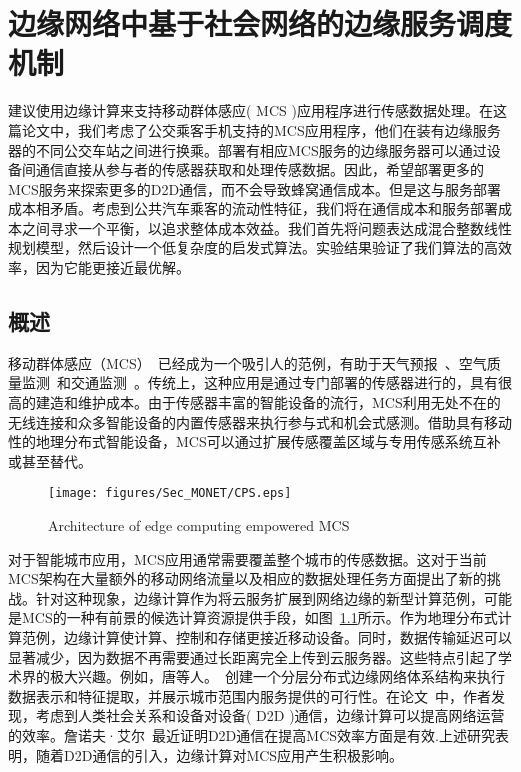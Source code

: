 \chapter{边缘网络中基于社会网络的边缘服务调度机制}

建议使用边缘计算来支持移动群体感应( MCS )应用程序进行传感数据处理。在这篇论文中，我们考虑了公交乘客手机支持的MCS应用程序，他们在装有边缘服务器的不同公交车站之间进行换乘。部署有相应MCS服务的边缘服务器可以通过设备间通信直接从参与者的传感器获取和处理传感数据。因此，希望部署更多的MCS服务来探索更多的D2D通信，而不会导致蜂窝通信成本。但是这与服务部署成本相矛盾。考虑到公共汽车乘客的流动性特征，我们将在通信成本和服务部署成本之间寻求一个平衡，以追求整体成本效益。我们首先将问题表达成混合整数线性规划模型，然后设计一个低复杂度的启发式算法。实验结果验证了我们算法的高效率，因为它能更接近最优解。


\section{概述}

移动群体感应（MCS）~\cite{ganti2011mobile,DBLP:journals/csur/GuoWYWYHZ15}已经成为一个吸引人的范例，有助于天气预报~\cite{DBLP:conf/icc/YuZZWKL10}、空气质量监测~\cite{DBLP:conf/huc/ZhangXWC14}和交通监测~\cite{DBLP:conf/icdcs/ZhouJL15}。传统上，这种应用是通过专门部署的传感器进行的，具有很高的建造和维护成本。由于传感器丰富的智能设备的流行，MCS利用无处不在的无线连接和众多智能设备的内置传感器来执行参与式和机会式感测。借助具有移动性的地理分布式智能设备，MCS可以通过扩展传感覆盖区域与专用传感系统互补或甚至替代。

\begin{figure}[!h]
\centering
\texttt{[image: figures/Sec\_MONET/CPS.eps]}
\vspace{-0.5em}
\caption{Architecture of edge computing empowered MCS}
\label{Figure_edge}
\end{figure}

对于智能城市应用，MCS应用通常需要覆盖整个城市的传感数据。这对于当前MCS架构在大量额外的移动网络流量以及相应的数据处理任务方面提出了新的挑战。针对这种现象，边缘计算作为将云服务扩展到网络边缘的新型计算范例，可能是MCS的一种有前景的候选计算资源提供手段，如图~\ref{Figure_edge}所示。作为地理分布式计算范例，边缘计算使计算、控制和存储更接近移动设备。同时，数据传输延迟可以显著减少，因为数据不再需要通过长距离完全上传到云服务器。这些特点引起了学术界的极大兴趣。例如，唐等人。~\cite{DBLP:journals/tii/TangCHPWHY17}创建一个分层分布式边缘网络体系结构来执行数据表示和特征提取，并展示城市范围内服务提供的可行性。在论文~\cite{DBLP:conf/wasa/Yan0WWW17}中，作者发现，考虑到人类社会关系和设备对设备( D2D )通信，边缘计算可以提高网络运营的效率。詹诺夫·艾尔~\cite{DBLP:journals/iotj/ZhanXZW18}最近证明D2D通信在提高MCS效率方面是有效.上述研究表明，随着D2D通信的引入，边缘计算对MCS应用产生积极影响。


